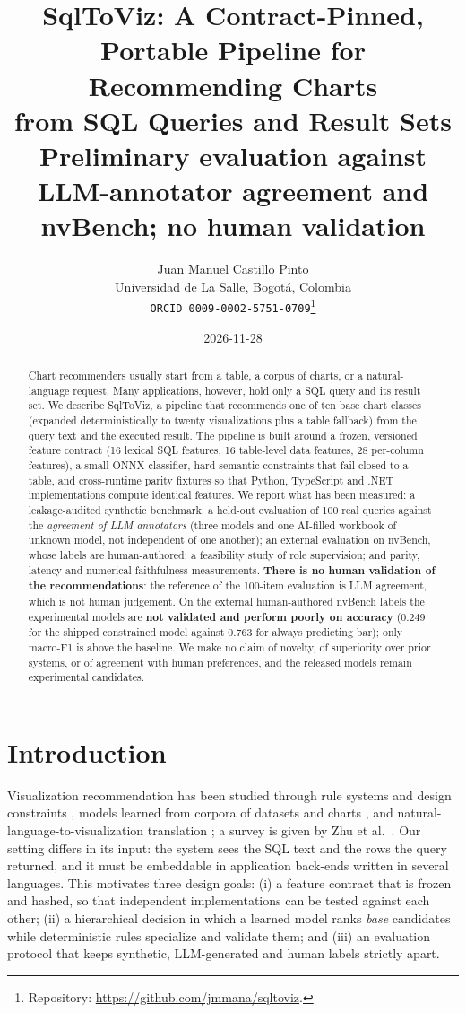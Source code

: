 \documentclass[11pt]{article}
\title{SqlToViz: A Contract-Pinned, Portable Pipeline for Recommending Charts\\ from SQL Queries and Result Sets\\[2pt]\large Preliminary evaluation against LLM-annotator agreement and nvBench; no human validation}
\author{Juan Manuel Castillo Pinto\\ Universidad de La Salle, Bogot\'a, Colombia\\ \texttt{ORCID 0009-0002-5751-0709}\thanks{Repository: \url{https://github.com/jmmana/sqltoviz}.}}
\date{2026-11-28}
\begin{document}
\maketitle

\begin{abstract}
Chart recommenders usually start from a table, a corpus of charts, or a natural-language request. Many applications, however, hold only a SQL query and its result set. We describe SqlToViz, a pipeline that recommends one of ten base chart classes (expanded deterministically to twenty visualizations plus a table fallback) from the query text and the executed result. The pipeline is built around a frozen, versioned feature contract (16 lexical SQL features, 16 table-level data features, 28 per-column features), a small ONNX classifier, hard semantic constraints that fail closed to a table, and cross-runtime parity fixtures so that Python, TypeScript and .NET implementations compute identical features. We report what has been measured: a leakage-audited synthetic benchmark; a held-out evaluation of 100 real queries against the \emph{agreement of LLM annotators} (three models and one AI-filled workbook of unknown model, not independent of one another); an external evaluation on nvBench, whose labels are human-authored; a feasibility study of role supervision; and parity, latency and numerical-faithfulness measurements. \textbf{There is no human validation of the recommendations}: the reference of the 100-item evaluation is LLM agreement, which is not human judgement. On the external human-authored nvBench labels the experimental models are \textbf{not validated and perform poorly on accuracy} (0.249 for the shipped constrained model against 0.763 for always predicting bar); only macro-F1 is above the baseline. We make no claim of novelty, of superiority over prior systems, or of agreement with human preferences, and the released models remain experimental candidates.
\end{abstract}

\section{Introduction}
Visualization recommendation has been studied through rule systems and design constraints \cite{mackinlay2007showme,wongsuphasawat2016voyager,moritz2018draco,yang2023draco2}, models learned from corpora of datasets and charts \cite{hu2019vizml,luo2018deepeye,zhou2020table2charts,dibia2019data2vis}, and natural-language-to-visualization translation \cite{luo2021nvbench,luo2022ncnet,dibia2023lida}; a survey is given by Zhu et al.\ \cite{zhu2020survey}. Our setting differs in its input: the system sees the SQL text and the rows the query returned, and it must be embeddable in application back-ends written in several languages. This motivates three design goals: (i) a feature contract that is frozen and hashed, so that independent implementations can be tested against each other; (ii) a hierarchical decision in which a learned model ranks \emph{base} candidates while deterministic rules specialize and validate them; and (iii) an evaluation protocol that keeps synthetic, LLM-generated and human labels strictly apart.
\end{document}
